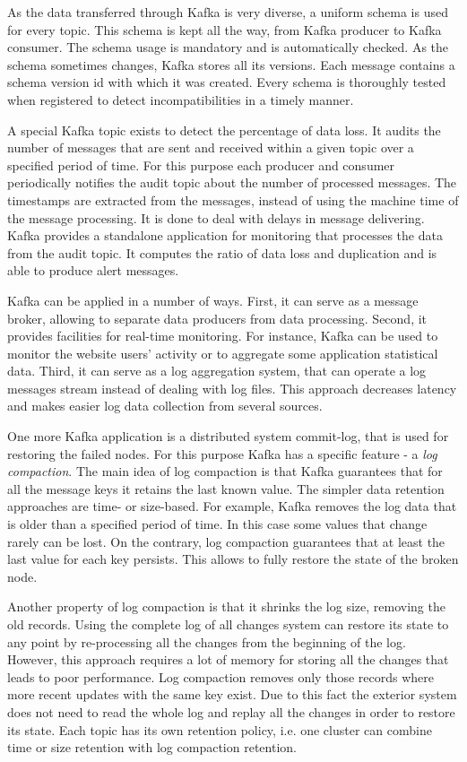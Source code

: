 As the data transferred through Kafka is very diverse, a uniform schema is used for every topic.
This schema is kept all the way, from Kafka producer to Kafka consumer.
The schema usage is mandatory and is automatically checked.
As the schema sometimes changes, Kafka stores all its versions.
Each message contains a schema version id with which it was created.
Every schema is thoroughly tested when registered to detect incompatibilities in a timely manner.

A special Kafka topic exists to detect the percentage of data loss.
It audits the number of messages that are sent and received within a given topic over a specified period of time.
For this purpose each producer and consumer periodically notifies the audit topic about the number of processed messages.
The timestamps are extracted from the messages, instead of using the machine time of the message processing.
It is done to deal with delays in message delivering.
Kafka provides a standalone application for monitoring that processes the data from the audit topic.
It computes the ratio of data loss and duplication and is able to produce alert messages.

Kafka can be applied in a number of ways.
First, it can serve as a message broker, allowing to separate data producers from data processing.
Second, it provides facilities for real-time monitoring.
For instance, Kafka can be used to monitor the website users' activity or to aggregate some application statistical data.
Third, it can serve as a log aggregation system, that can operate a log messages stream instead of dealing with log files.
This approach decreases latency and makes easier log data collection from several sources.

One more Kafka application is a distributed system commit-log, that is used for restoring the failed nodes.
For this purpose Kafka has a specific feature - a \textit{log compaction}.
The main idea of log compaction is that Kafka guarantees that for all the message keys it retains the last known value.
The simpler data retention approaches are time- or size-based.
For example, Kafka removes the log data that is older than a specified period of time.
In this case some values that change rarely can be lost.
On the contrary, log compaction guarantees that at least the last value for each key persists.
This allows to fully restore the state of the broken node.

Another property of log compaction is that it shrinks the log size, removing the old records.
Using the complete log of all changes system can restore its state to any point by re-processing all the changes from the beginning of the log.
However, this approach requires a lot of memory for storing all the changes that leads to poor performance.
Log compaction removes only those records where more recent updates with the same key exist. 
Due to this fact the exterior system does not need to read the whole log and replay all the changes in order to restore its state.
Each topic has its own retention policy, i.e. one cluster can combine time or size retention with log compaction retention.

